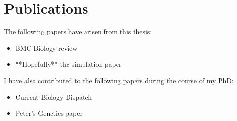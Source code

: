 \chapter{Publications}

The following papers have arisen from this thesis:
\begin{itemize}
  \item BMC Biology review
  \item **Hopefully** the simulation paper
\end{itemize}

I have also contributed to the following papers during the course of my PhD:
\begin{itemize}
  \item Current Biology Dispatch
  \item Peter's Genetics paper
\end{itemize}